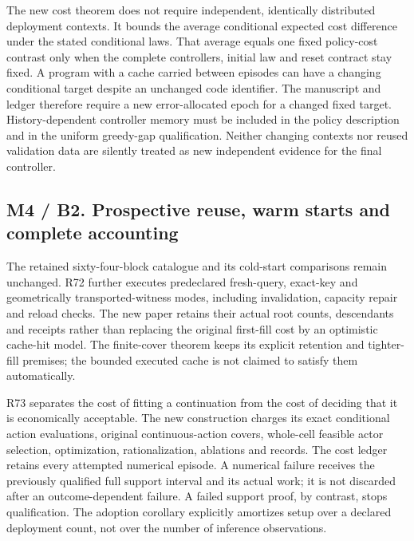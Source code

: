 \documentclass[ecta,nameyear,draft]{econsocart}
\begin{document}
The new cost theorem does not require independent, identically
distributed deployment contexts. It bounds the average conditional
expected cost difference under the stated conditional laws. That average
equals one fixed policy-cost contrast only when the complete
controllers, initial law and reset contract stay fixed. A program with a
cache carried between episodes can have a changing conditional target
despite an unchanged code identifier. The manuscript and ledger
therefore require a new error-allocated epoch for a changed fixed
target. History-dependent controller memory must be included in the
policy description and in the uniform greedy-gap qualification. Neither
changing contexts nor reused validation data are silently treated as new
independent evidence for the final controller.

\hypertarget{m4-b2.-prospective-reuse-warm-starts-and-complete-accounting}{%
\subsection{M4 / B2. Prospective reuse, warm starts and complete
accounting}\label{m4-b2.-prospective-reuse-warm-starts-and-complete-accounting}}

The retained sixty-four-block catalogue and its cold-start comparisons
remain unchanged. R72 further executes predeclared fresh-query,
exact-key and geometrically transported-witness modes, including
invalidation, capacity repair and reload checks. The new paper retains
their actual root counts, descendants and receipts rather than replacing
the original first-fill cost by an optimistic cache-hit model. The
finite-cover theorem keeps its explicit retention and tighter-fill
premises; the bounded executed cache is not claimed to satisfy them
automatically.

R73 separates the cost of fitting a continuation from the cost of
deciding that it is economically acceptable. The new construction
charges its exact conditional action evaluations, original
continuous-action covers, whole-cell feasible actor selection,
optimization, rationalization, ablations and records. The cost ledger
retains every attempted numerical episode. A numerical failure receives
the previously qualified full support interval and its actual work; it
is not discarded after an outcome-dependent failure. A failed support
proof, by contrast, stops qualification. The adoption corollary
explicitly amortizes setup over a declared deployment count, not over
the number of inference observations.
\end{document}
